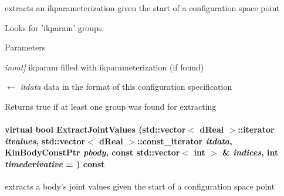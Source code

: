 extracts an ikparameterization given the start of a configuration space point 

Looks for 'ikparam' groups. 
\begin{DoxyParams}{Parameters}
\item[{\em inout\mbox{]}}]ikparam filled with ikparameterization (if found) \item[\mbox{$\leftarrow$} {\em itdata}]data in the format of this configuration specification \end{DoxyParams}
\begin{DoxyReturn}{Returns}
true if at least one group was found for extracting 
\end{DoxyReturn}
\hypertarget{classOpenRAVE_1_1ConfigurationSpecification_ac04681582ab6d866a55da90e9913bfc2}{
\paragraph[{ExtractJointValues}]{\setlength{\rightskip}{0pt plus 5cm}virtual bool ExtractJointValues (std::vector$<$ dReal $>$::iterator {\em itvalues}, \/  std::vector$<$ dReal $>$::const\_\-iterator {\em itdata}, \/  KinBodyConstPtr {\em pbody}, \/  const std::vector$<$ int $>$ \& {\em indices}, \/  int {\em timederivative} = {}) const}\hfill}
\label{classOpenRAVE_1_1ConfigurationSpecification_ac04681582ab6d866a55da90e9913bfc2}


extracts a body's joint values given the start of a configuration space point 

